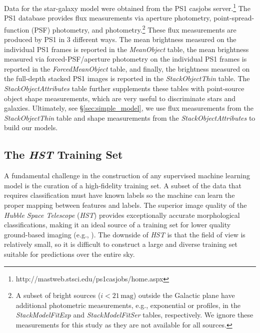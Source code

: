 \documentclass[twocolumn]{aastex62}
\begin{document}
Data for the star-galaxy model were obtained from the PS1 casjobs
server.\footnote{http://mastweb.stsci.edu/ps1casjobs/home.aspx} The PS1
database provides flux measurements via aperture photometry,
point-spread-function (PSF) photometry, and \citet{Kron80}
photometry.\footnote{A subset of bright sources ($i < 21\,\mathrm{mag}$)
outside the Galactic plane have additional photometric measurements, e.g.,
exponential or \citet{Sersic63} profiles, in the \textit{StackModelFitExp} and
\textit{StackModelFitSer} tables, respectively. We ignore these measurements
for this study as they are not available for all sources.} These flux
measurements are produced by PS1 in 3 different ways. The mean brightness
measured on the individual PS1 frames is reported in the \textit{MeanObject}
table, the mean brightness measured via forced-PSF/aperture photometry on the
individual PS1 frames is reported in the \textit{ForcedMeanObject} table, and
finally, the brightness measured on the full-depth stacked PS1 images is
reported in the \textit{StackObjectThin} table. The
\textit{StackObjectAttributes} table further supplements these tables with
point-source object shape measurements, which are very useful to discriminate
stars and galaxies. Ultimately, see \S\ref{sec:simple_model}, we use flux
measurements from the \textit{StackObjectThin} table and shape measurements
from the \textit{StackObjectAttributes} to build our models.

\subsection{The \textit{HST} Training Set} 

A fundamental challenge in the construction of any supervised machine learning
model is the curation of a high-fidelity training set. A subset of the data
that requires classification must have known labels so the machine can learn
the proper mapping between features and labels. The superior image quality of
the \textit{Hubble Space Telescope} (\textit{HST}) provides exceptionally
accurate morphological classifications, making it an ideal source of a training
set for lower quality ground-based imaging (e.g., \citealt{Lupton01}). The
downside of \textit{HST} is that the field of view is relatively small, so it
is difficult to construct a large and diverse training set suitable for
predictions over the entire sky.
\end{document}
